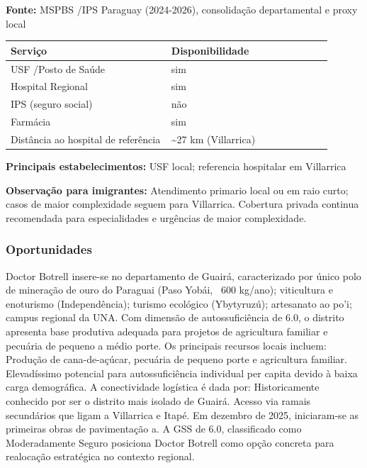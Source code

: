 \textbf{Fonte:} MSPBS /\allowbreak  IPS Paraguay (2024-2026), consolidação
departamental e proxy local

{\def\LTcaptype{none} %
\begin{longtable}{@{}>{\raggedright\arraybackslash}p{0.45\linewidth} >{\raggedright\arraybackslash}p{0.45\linewidth}@{}}
\toprule\noalign{}
Serviço & Disponibilidade \\
\midrule\noalign{}
\endhead
\bottomrule\noalign{}
\endlastfoot
USF /\allowbreak  Posto de Saúde & sim \\
Hospital Regional & sim \\
IPS (seguro social) & não \\
Farmácia & sim \\
Distância ao hospital de referência & \textasciitilde27 km
(Villarrica) \\
\end{longtable}
}

\textbf{Principais estabelecimentos:} USF local; referencia hospitalar
em Villarrica

\textbf{Observação para imigrantes:} Atendimento primario local ou em
raio curto; casos de maior complexidade seguem para Villarrica.
Cobertura privada continua recomendada para especialidades e urgências
de maior complexidade.
\newpage

\subsubsection*{Oportunidades}\label{oport-doctor-botrell-0403}
Doctor Botrell insere-se no departamento de Guairá, caracterizado por único polo de mineração de ouro do Paraguai (Paso Yobái, ~600 kg/ano); viticultura e enoturismo (Independência); turismo ecológico (Ybytyruzú); artesanato ao po'i; campus regional da UNA. Com dimensão de autossuficiência de 6.0, o distrito apresenta base produtiva adequada para projetos de agricultura familiar e pecuária de pequeno a médio porte. Os principais recursos locais incluem: Produção de cana-de-açúcar, pecuária de pequeno porte e agricultura familiar. Elevadíssimo potencial para autossuficiência individual per capita devido à baixa carga demográfica. A conectividade logística é dada por: Historicamente conhecido por ser o distrito mais isolado de Guairá. Acesso via ramais secundários que ligam a Villarrica e Itapé. Em dezembro de 2025, iniciaram-se as primeiras obras de pavimentação a. A GSS de 6.0, classificado como Moderadamente Seguro posiciona Doctor Botrell como opção concreta para realocação estratégica no contexto regional.

